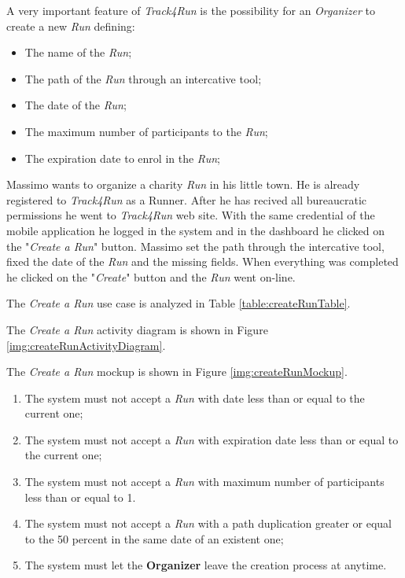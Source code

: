 A very important feature of \textit{Track4Run} is the possibility for an \textit{Organizer} to create a new \textit{Run} defining:
\begin{itemize}
  \item The name of the \textit{Run};
  \item The path of the \textit{Run} through an intercative tool;
  \item The date of the \textit{Run};
  \item The maximum number of participants to the \textit{Run};
  \item The expiration date to enrol in the \textit{Run};
\end{itemize}

Massimo wants to organize a charity \textit{Run} in his little town. He is already registered to \textit{Track4Run} as a Runner. After he has recived all bureaucratic permissions he went to \textit{Track4Run} web site.
With the same credential of the mobile application he logged in the system and in the dashboard he clicked on the "\textit{Create a Run}" button. Massimo set the path through the intercative tool, fixed the date of the \textit{Run} and the missing fields. When everything was completed he clicked on the "\textit{Create}" button and the \textit{Run} went on-line.

The \textit{Create a Run} use case is analyzed in Table \ref{table:createRunTable}.

The \textit{Create a Run} activity diagram is shown in Figure \ref{img:createRunActivityDiagram}.

The \textit{Create a Run} mockup is shown in Figure \ref{img:createRunMockup}.

\begin{enumerate}
  \item The system must not accept a \textit{Run} with date less than or equal to the current one;
  \item The system must not accept a \textit{Run} with expiration date less than or equal to the current one;
  \item The system must not accept a \textit{Run} with maximum number of participants less than or equal to 1.
  \item The system must not accept a \textit{Run} with a path duplication greater or equal to the 50 percent in the same date of an existent one;
  \item The system must let the \textbf{Organizer} leave the creation process at anytime.
\end{enumerate}

